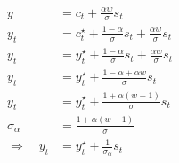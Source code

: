 \documentclass[12pt]{article}
\begin{document}
\begin{align}
    y                     & = c_t + \frac{\alpha w}{\sigma}s_t                                       \\
    y_t                   & = c_t^{\star} + \frac{1-\alpha}{\sigma}s_t + \frac{\alpha w}{\sigma} s_t \\
    y_t                   & = y_t^{\star} + \frac{1-\alpha}{\sigma}s_t + \frac{\alpha w}{\sigma} s_t \\
    y_t                   & = y_t^{\star} + \frac{1-\alpha + \alpha w}{\sigma}s_t                    \\
    y_t                   & = y_t^{\star} + \frac{1+ \alpha(w-1)}{\sigma}s_t                         \\
    \sigma_\alpha         & = \frac{1+ \alpha(w-1)}{\sigma}                                          \\
    \Rightarrow \quad y_t & =y^{\star}_t + \frac{1}{\sigma_\alpha}s_t \label{eq:output_as_world_output_plus_trade}
\end{align}
\end{document}
